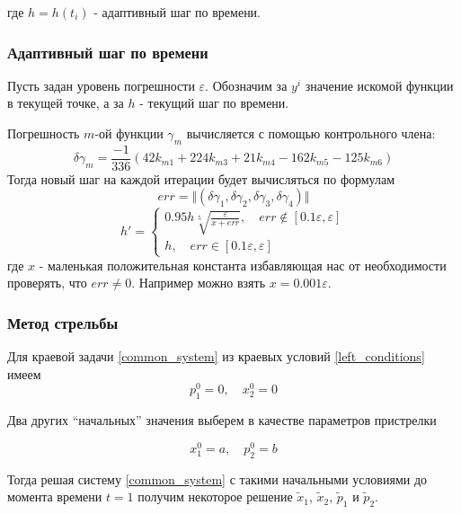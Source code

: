 \documentclass[a4paper,12pt]{article}
\begin{document}
где \(h=h(t_i)\) - адаптивный шаг по времени.

\subsubsection*{Адаптивный шаг по времени}

Пусть задан уровень погрешности \(\varepsilon\). Обозначим за \(y^i\)
значение искомой функции в текущей точке, а за \(h\) - текущий шаг по
времени.

Погрешность \(m\)-ой функции \(\gamma_{m}\) вычисляется с помощью контрольного члена:
\begin{equation*}
  \delta\gamma_{m} = \frac{-1}{336}\left(42 k_{m1}+224k_{m3}+21k_{m4}-162 k_{m5}-125 k_{m6}\right)
\end{equation*}
Тогда новый шаг на каждой итерации будет вычисляться по формулам
\begin{equation*}
  err = \Vert (\delta\gamma_{1}, \delta\gamma_{2}, \delta\gamma_{3}, \delta\gamma_{4})\Vert
\end{equation*}
\begin{equation*}
  h'=\begin{cases}
    0.95 h \sqrt[5]{\frac{\varepsilon}{x+err}}, \quad err \not\in [0.1 \varepsilon, \varepsilon]\\
    h, \quad  err \in [0.1 \varepsilon, \varepsilon]
  \end{cases}
\end{equation*}
где \(x\) - маленькая
положительная константа избавляющая нас от необходимости проверять, что
\(err \neq 0\). Например можно взять \(x=0.001 \varepsilon\).

\subsubsection*{Метод стрельбы}

Для краевой задачи \cref{common_system} из краевых условий \cref{left_conditions} имеем
\begin{equation*}
  p_1^0=0, \quad x_2^0=0
\end{equation*}

Два других ``начальных'' значения выберем в качестве параметров
пристрелки

\begin{equation*}
  x_1^0=a, \quad p_2^0=b
\end{equation*}

Тогда решая систему \cref{common_system} с такими начальными условиями до момента времени \(t=1\) получим некоторое решение \(\tilde{x}_1\), \(\tilde{x}_2\), \(\tilde{p}_1\) и \(\tilde{p}_2\).
\end{document}
